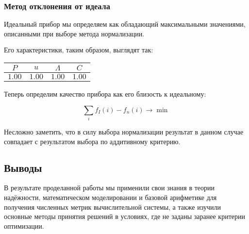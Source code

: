 \documentclass[12pt, a4paper] {ncc}
\begin{document}
\subsubsection{Метод отклонения от идеала}

Идеальный прибор мы определяем как обладающий максимальными значениями,
описанными при выборе метода нормализации.

Его характеристики, таким образом, выглядят так:

\begin{tabular}{|c||c|c|c|}
\hline
$P$    & $u$     & $\Lambda$ & $C$ \\ \hline
\hline
$1.00$ & $1.00$  & $1.00$    & $1.00$ \\ \hline
\end{tabular}

Теперь определим качество прибора как его близость к идеальному:

$$\sum_i f_I(i) - f_n(i) \rightarrow \min$$

Несложно заметить, что в силу выбора нормализации результат в данном случае
совпадает с результатом выбора по аддитивному критерию.

\subsection{Выводы}

В результате проделанной работы мы применили свои знания в теории надёжности,
математическом моделировании и базовой арифметике для получения численных метрик
вычислительной системы, а также изучили основные методы принятия решений в
условиях, где не заданы заранее критерии оптимизации.
\end{document}
